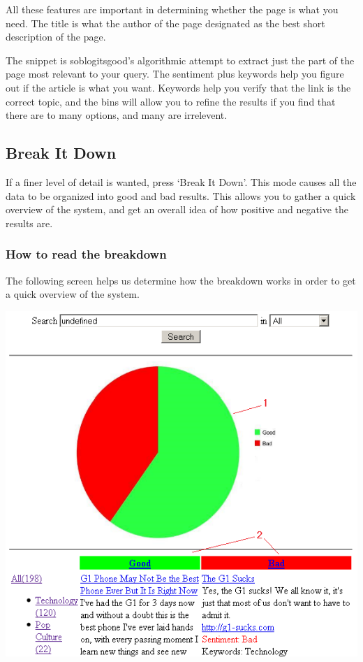 \documentclass[titlepage]{article}
\begin{document}
All these features are important in determining whether the page is what you
need. The title is what the author of the page designated as the best short
description of the page.

The snippet is \textsf{soblogitsgood}'s algorithmic attempt to extract just the part of the
page most relevant to your query. The sentiment plus keywords help you figure
out if the article is what you want. Keywords help you verify that the link is
the correct topic, and the bins will allow you to refine the results if you
find that there are to many options, and many are irrelevent.

\subsection{Break It Down}
If a finer level of detail is wanted, press `Break It Down'. This mode causes
all the data to be organized into good and bad results. This allows you to
gather a quick overview of the system, and get an overall idea of how positive
and negative the results are.

\subsubsection{How to read the breakdown}
The following screen helps us determine how the breakdown works in order to
get a quick overview of the system.
\begin{center}
\includegraphics{brokendown.png}
\end{center}
\end{document}
